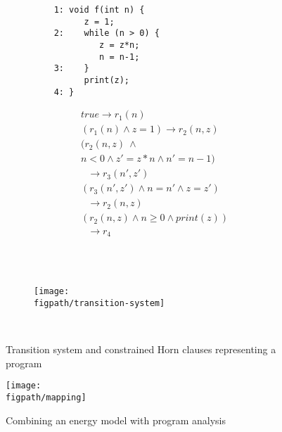 \begin{figure}
  \begin{subfigure}[b]{.49\linewidth}
  \centering
         \begin{lstlisting}
    1: void f(int n) {
          z = 1;
    2:    while (n > 0) {
             z = z*n;
             n = n-1;
    3:    }
          print(z);	
    4: }		
              \end{lstlisting}
    \caption{}
  \end{subfigure}
  \hspace{0.5cm}
  \begin{subfigure}[b]{.49\linewidth}
\begin{center}
\[
     \begin{array}{l}
	true \rightarrow r_1(n)\\
	(r_1(n) \wedge z=1)  \rightarrow r_2(n,z)\\
        (r_2(n,z)~ \wedge \\
	n < 0 \wedge z'=z*n  \wedge n'=n-1)\\
         \ \ \       \rightarrow r_3(n',z')\\
        (r_3(n',z') \wedge n=n' \wedge z=z')\\
        \ \ \         \rightarrow r_2(n,z)\\
        (r_2(n,z) \wedge n \ge 0 \wedge print(z))\\
         \ \ \      \rightarrow r_4	
     \end{array}
\]
    \end{center}
    \caption{}
  \end{subfigure}\\ \\
    \begin{subfigure}[b]{\linewidth}
\begin{center}
\texttt{[image: \\figpath/transition-system]}
    \end{center}
    \caption{}
  \end{subfigure}\\

  \caption{Transition system and constrained Horn clauses representing a program}
  \label{fig-horn}
\end{figure}

\begin{figure}
\texttt{[image: \\figpath/mapping]}   
 \caption{Combining an energy model with program analysis}
 \label{fig-model-mapping}
 \end{figure}

